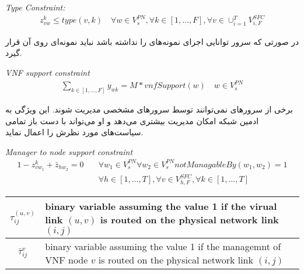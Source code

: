 \begin{latin}
    \textit{Type Constraint:}
    \begin{align}
        z_{vw}^{k} \le type(v, k)
        \quad
        \forall w \in V_{s}^{PN},
        \forall k \in [1,\ldots, F],
        \forall v \in \cup_{i=1}^T V_{i, F}^{SFC}
    \end{align}
\end{latin}

در صورتی که سرور 
توانایی اجرای نمونه‌های 
را نداشته باشد نباید نمونه‌ای روی آن قرار گیرد.

\begin{latin}
    \textit{VNF support constraint}
    \begin{align}
        \sum_{k \in [1, \dots, F]} y_{wk}  = M * vnfSupport(w)
        \quad
        w \in V_{s}^{PN}
    \end{align}
\end{latin}

برخی از سرورهای نمی‌توانند توسط سرورهای مشخصی مدیریت شوند.
این ویژگی به ادمین شبکه امکان مدیریت بیشتری می‌دهد و او می‌تواند با دست باز تمامی
سیاست‌های مورد نظرش را اعمال نماید.

\begin{latin}
    \textit{Manager to node support constraint}
    \begin{align}
        1 - z_{vw_1}^k + \bar{z}_{hw_2} = 0
        \quad
        & \forall w_1 \in V_s^{PN} \forall w_2 \in V_s^{PN} notManagableBy(w_1, w_2) = 1 \nonumber \\
        & \forall h \in [1,\dots,T],
        \forall v \in V_{h,F}^{SFC},
        \forall k \in [1,\dots,T]
    \end{align}
\end{latin}

\begin{center}\begin{latin}\begin{tabular}{|c|p{10cm}|}
    \hline
    \(\tau^{(u,v)}_{ij}\) & binary variable assuming the value 1 if the virual link \((u,v)\) is routed on the physical network link \((i,j)\) \\
    \hline
    \(\bar{\tau}^{v}_{ij}\) & binary variable assuming the value 1 if the managemnt of VNF node $v$ is routed on the physical network link \((i,j)\) \\
    \hline
\end{tabular}\end{latin}\end{center}

